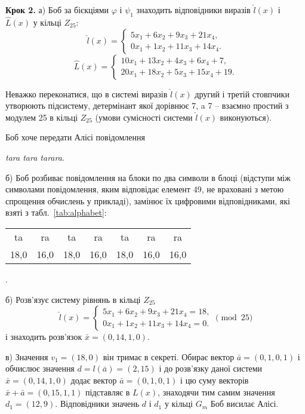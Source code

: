 \documentclass{ceurart}
\begin{document}
{\textbf{Крок 2.} а) Боб за бієкціями \(\varphi\) і \(\psi_1\)
знаходить відповідники виразів \(\hat l(x)\) і
\(\hat L(x)\) у кільці \(Z_{25}\):
\[
\hat l(x)= \begin{cases}
  5x_1 + 6x_2 +  9x_3 + 21x_4,\\
  0x_1 + 1x_2 + 11x_3 + 14x_4.
\end{cases}
\]
\[
\hat L(x) = \begin{cases}
 10x_1 + 13x_2 + 4x_3 + 6x_4 + 7,\\
 20x_1 + 18x_2 + 5x_3 + 15x_4 + 19.
\end{cases}
\]

Неважко переконатися, що в системі виразів \(\hat l(x)\) другий і
третій стовпчики утворюють підсистему, детермінант
якої дорівнює 7, a 7 -- взаємно простий з модулем 25 в кільці \(Z_{25}\)
(умови сумісності системи \(\hat l(x)\) виконуються).

Боб хоче передати Алісі повідомлення
\begin{center}
     {\em tara tara tarara}.
\end{center}

б) Боб розбиває повідомлення на блоки по два символи в блоці
(відступи між символами повідомлення, яким відповідає елемент 49,
не враховані з метою спрощення обчислень у прикладі), замінює їх
цифровими відповідниками, які взяті з табл.~\ref{tab:alphabet}:
\begin{center}
\begin{tabular}{ccccccc}
       ta  &  ra  &  ta  &  ra  & ta   &  ra  &  ra \\
      18,0 & 16,0 & 18,0 & 16,0 & 18,0 & 16,0 & 16,0\\
\end{tabular}.
\end{center}

б) Розв'язує систему рівнянь в кільці \(Z_{25}\)
\[
\hat l(x)= \begin{cases}
  5x_1 + 6x_2 +  9x_3 + 21x_4 = 18,\\
  0x_1 + 1x_2 + 11x_3 + 14x_4 = 0.
\end{cases} \pmod{25}
\]
і знаходить розв'язок \(\bar x = (0,14,1,0)\).

в) Значення \(v_1 = (18,0)\) він тримає в секреті.
Обирає вектор \(\bar a=(0,1,0,1)\) і обчислює значення
\(d=l(\bar a)=(2,15)\) і до розв'язку даної
системи \(\bar x = (0,14,1,0)\) додає вектор \(\bar a =
(0,1,0,1)\) і цю суму векторів \(\bar x + \bar a = (0,15,1,1)\)
підставляє в \(L(x)\), знаходячи тим самим значення
\(d_1 = (12,9)\). Відповідники значень \(d\) і \(d_1\)
у кільці \(G_m\) Боб висилає Алісі.

}
\end{document}
